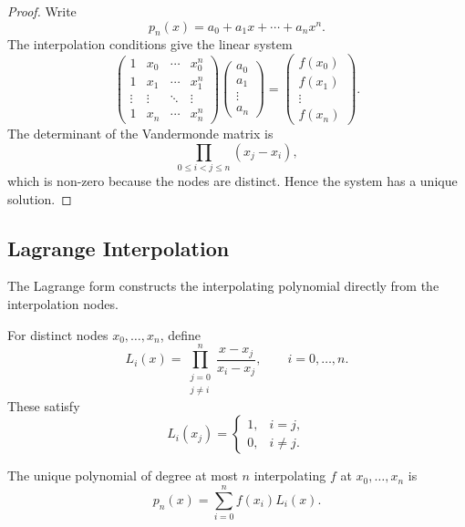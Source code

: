 \begin{proof}
  Write
  \[
    p_n(x)=a_0+a_1x+\cdots+a_nx^n.
  \]
  The interpolation conditions give the linear system
  \[
    \begin{pmatrix}
      1 & x_0 & \cdots & x_0^n\\
      1 & x_1 & \cdots & x_1^n\\
      \vdots & \vdots & \ddots & \vdots\\
      1 & x_n & \cdots & x_n^n
    \end{pmatrix}
    \begin{pmatrix}
      a_0\\a_1\\\vdots\\a_n
    \end{pmatrix}
    =
    \begin{pmatrix}
      f(x_0)\\f(x_1)\\\vdots\\f(x_n)
    \end{pmatrix}.
  \]
  The determinant of the Vandermonde matrix is
  \[
    \prod_{0\leq i<j\leq n}(x_j-x_i),
  \]
  which is non-zero because the nodes are distinct. Hence the system has a unique solution.
\end{proof}

\subsection{Lagrange Interpolation}

The Lagrange form constructs the interpolating polynomial directly from the interpolation nodes.

\begin{definition}
  For distinct nodes \(x_0,\ldots,x_n\), define
  \[
    L_i(x)=
    \prod_{\substack{j=0\\j\neq i}}^n
    \frac{x-x_j}{x_i-x_j},
    \qquad i=0,\ldots,n.
  \]
  These satisfy
  \[
    L_i(x_j)=
    \begin{cases}
      1, & i=j,\\
      0, & i\neq j.
    \end{cases}
  \]
\end{definition}

\begin{theorem}
  The unique polynomial of degree at most \(n\) interpolating \(f\) at \(x_0,\ldots,x_n\) is
  \[
    \boxed{
      p_n(x)=\sum_{i=0}^n f(x_i)L_i(x).
    }
  \]
\end{theorem}


